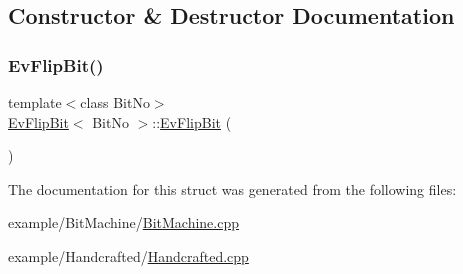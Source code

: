 \subsection{Constructor \& Destructor Documentation}
\mbox{\label{struct_ev_flip_bit_a87ac8da76c92a67d503bc7774e1ae84e}} 
\subsubsection{\texorpdfstring{Ev\+Flip\+Bit()}{EvFlipBit()}}
{\footnotesize\ttfamily template$<$class Bit\+No$>$ \\
\mbox{\hyperlink{struct_ev_flip_bit}{Ev\+Flip\+Bit}}$<$ Bit\+No $>$\+::\mbox{\hyperlink{struct_ev_flip_bit}{Ev\+Flip\+Bit}} (\begin{DoxyParamCaption}{ }\end{DoxyParamCaption})\hspace{0.3cm}{\ttfamily [inline]}}



The documentation for this struct was generated from the following files\+:\begin{DoxyCompactItemize}
\item 
example/\+Bit\+Machine/\mbox{\hyperlink{_bit_machine_8cpp}{Bit\+Machine.\+cpp}}\item 
example/\+Handcrafted/\mbox{\hyperlink{_handcrafted_8cpp}{Handcrafted.\+cpp}}\end{DoxyCompactItemize}

